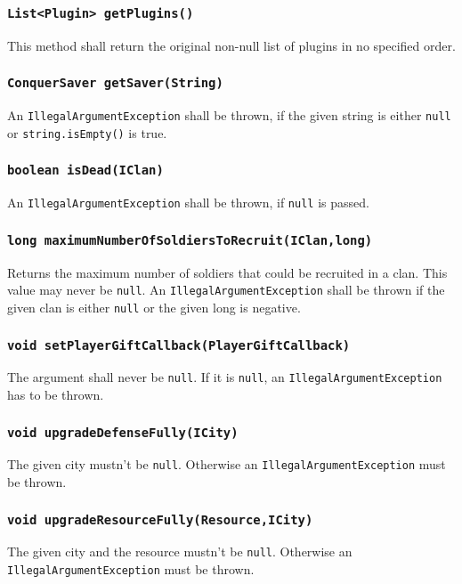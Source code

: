 \documentclass{article}
\begin{document}
\subsubsection{\texttt{List<Plugin> getPlugins()}}
This method shall return the original non-null list of plugins in no specified order.

\subsubsection{\texttt{ConquerSaver getSaver(String)}}

An \texttt{IllegalArgumentException} shall be thrown, if the given
string is either \texttt{null} or \texttt{string.isEmpty()} is true.

\subsubsection{\texttt{boolean isDead(IClan)}}
An \texttt{IllegalArgumentException} shall be thrown, if \texttt{null} is passed.

\subsubsection{\texttt{long maximumNumberOfSoldiersToRecruit(IClan,long)}}
Returns the maximum number of soldiers that could be recruited in a clan. This value may never be \texttt{null}.
An \texttt{IllegalArgumentException} shall be thrown if the given clan is either \texttt{null} or the given long is negative.

\subsubsection{\texttt{void setPlayerGiftCallback(PlayerGiftCallback)}}
The argument shall never be \texttt{null}.
If it is \texttt{null}, an \texttt{IllegalArgumentException} has to be thrown.

\subsubsection{\texttt{void upgradeDefenseFully(ICity)}}
The given city mustn't be \texttt{null}.
Otherwise an \texttt{IllegalArgumentException} must be thrown.

\subsubsection{\texttt{void upgradeResourceFully(Resource,ICity)}}
The given city and the resource mustn't be \texttt{null}.
Otherwise an \texttt{IllegalArgumentException} must be thrown.
\end{document}
